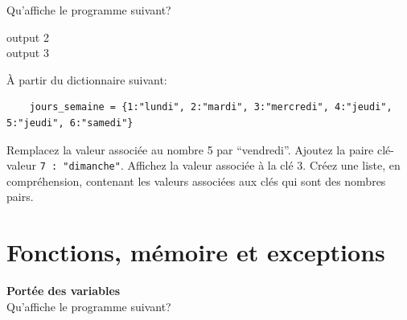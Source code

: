 \begin{Exercice}[5 minutes]
    Qu'affiche le programme suivant?
    

    \begin{solution}
        output 2 \\
        output 3
    \end{solution}
\end{Exercice}

\begin{Exercice}[5 minutes]
    À partir du dictionnaire suivant:
    \begin{lstlisting}
    jours_semaine = {1:"lundi", 2:"mardi", 3:"mercredi", 4:"jeudi", 5:"jeudi", 6:"samedi"} 
    \end{lstlisting}

    Remplacez la valeur associée au nombre 5 par ``vendredi''. Ajoutez la paire clé-valeur \lstinline{7 : "dimanche"}. Affichez la valeur associée à la clé 3.
    Créez une liste, en compréhension, contenant les valeurs associées aux clés qui sont des nombres pairs.

    \begin{solution}
        
    \end{solution}
\end{Exercice}


\section{Fonctions, mémoire et exceptions}
\begin{Exercice}[5 minutes] [Python] \textbf{Portée des variables}\\
    Qu'affiche le programme suivant? \\

    

    \begin{solution}
        
    \end{solution}

    
 \end{Exercice}

